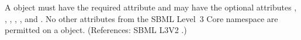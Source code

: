 A \LocalParameter object must have the required attribute  and
may have the optional attributes , , , ,
,  and .  No other attributes from
the SBML Level~3 Core namespace are permitted on a \LocalParameter object.
(References: SBML L3V2 .)
